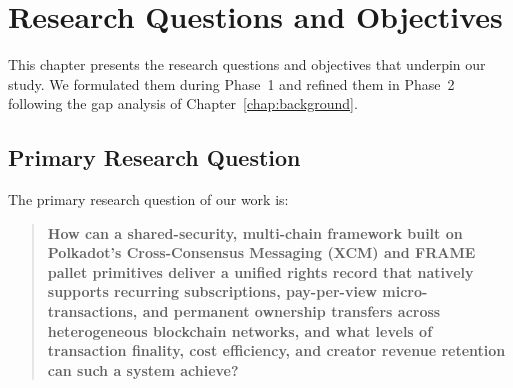 
\chapter{Research Questions and Objectives}\label{chap:research-questions}

This chapter presents the research questions and objectives that underpin our study. We formulated them during Phase~1 and refined them in Phase~2 following the gap analysis of Chapter~\ref{chap:background}.

\section{Primary Research Question}\label{sec:primary-research-question}

The primary research question of our work is:

\begin{quote}
\textbf{How can a shared-security, multi-chain framework built on Polkadot's Cross-Consensus Messaging (XCM) and FRAME pallet primitives deliver a unified rights record that natively supports recurring subscriptions, pay-per-view micro-transactions, and permanent ownership transfers across heterogeneous blockchain networks, and what levels of transaction finality, cost efficiency, and creator revenue retention can such a system achieve?}
\end{quote}

